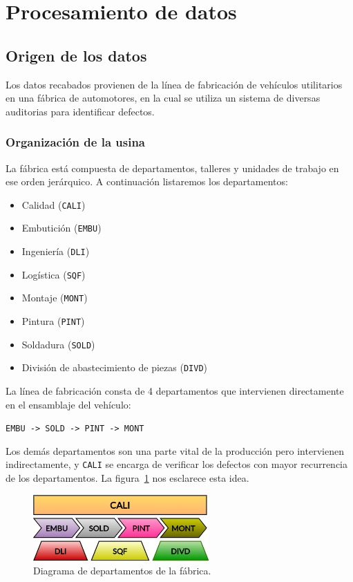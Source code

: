 \documentclass[a4paper,12pt]{article}
\begin{document}
		\section{Procesamiento de datos}
						
		\subsection{Origen de los datos}
		Los datos recabados provienen de la línea de fabricación de vehículos utilitarios en una fábrica de automotores, en la cual se utiliza un sistema de diversas auditorias para identificar defectos.
						
		\subsubsection{Organización de la usina}
		La fábrica está compuesta de departamentos, talleres y unidades de trabajo en ese orden jerárquico. A continuación listaremos los departamentos:
						
		\begin{itemize}[noitemsep, topsep=2pt]
			\item Calidad (\texttt{CALI})
			\item Embutición (\texttt{EMBU})
			\item Ingeniería (\texttt{DLI})
			\item Logística (\texttt{SQF})
			\item Montaje (\texttt{MONT})
			\item Pintura (\texttt{PINT})
			\item Soldadura (\texttt{SOLD})
			\item División de abastecimiento de piezas (\texttt{DIVD})
		\end{itemize}
						
		La línea de fabricación consta de 4 departamentos que intervienen directamente en el ensamblaje del vehículo:
						
		\texttt{EMBU -> SOLD -> PINT -> MONT}
						
		Los demás departamentos son una parte vital de la producción pero intervienen indirectamente, y \texttt{CALI} se encarga de verificar los defectos con mayor recurrencia de los departamentos. La figura~\ref{fig:dptodiagram} nos esclarece esta idea.
						
		\begin{figure}[H]
			\begin{center}				
				\includegraphics[width=0.6\textwidth]{usina.png}
				\caption{Diagrama de departamentos de la fábrica.}
				\label{fig:dptodiagram}
			\end{center}
		\end{figure}
						
\end{document}
